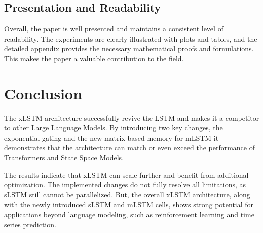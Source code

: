 \documentclass[a4paper,oneside,10pt,ngerman,english]{scrartcl}
\begin{document}
\subsection{Presentation and Readability}
\label{sec:readability}

Overall, the paper is well presented and maintains a consistent level of readability. The experiments are clearly illustrated with plots and tables, and the detailed appendix provides the necessary mathematical proofs and formulations. This makes the paper a valuable contribution to the field.


\section{Conclusion}
\label{sec:conclusion}

The xLSTM architecture successfully revive the LSTM and makes it a competitor to other Large Language Models. By introducing two key changes, the exponential gating and the new matrix-based memory for mLSTM it demonstrates that the architecture can match or even exceed the performance of Transformers and State Space Models. 

The results indicate that xLSTM can scale further and benefit from additional optimization. The implemented changes do not fully resolve all limitations, as sLSTM still cannot be parallelized. But, the overall xLSTM architecture, along with the newly introduced sLSTM and mLSTM cells, shows strong potential for applications beyond language modeling, such as reinforcement learning and time series prediction.



\printbibliography







\cleardoubleoddpage
\end{document}

